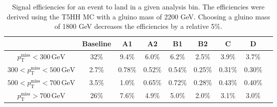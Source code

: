 \begin{table}[hbp!]
\centering
\caption{
Signal efficiencies for an event to land in a given analysis bin.
The efficiencies were derived using the T5HH MC with a gluino mass of 2200 GeV.
Choosing a gluino mass of 1800 GeV decreases the efficiencies by a relative 5\%.
}
\begin{tabular}{c | c c c c c c c c}
\hline
\hline
                                                            & Baseline & A1     & A2      & B1      & B2      & C       & D\\
\hline
$p_{\mathrm{T}}^{\mathrm{miss}}< 300\,\mathrm{GeV}$        & 32\%    & 9.4\%   & 6.0\%   & 6.2\%   & 2.5\%   & 3.9\%   & 3.7\% \\
$300 < p_{\mathrm{T}}^{\mathrm{miss}} < 500\,\mathrm{GeV}$  & 2.7\%   & 0.78\%  & 0.52\%  & 0.54\%  & 0.25\%  & 0.31\%  & 0.30\% \\
$500 < p_{\mathrm{T}}^{\mathrm{miss}} < 700\,\mathrm{GeV}$  & 3.5\%   & 1.0\%   & 0.65\%  & 0.72\%  & 0.28\%  & 0.43\%  & 0.40\% \\
$p_{\mathrm{T}}^{\mathrm{miss}} > 700\,\mathrm{GeV}$        & 26\%    & 7.6\%   & 4.9\%   & 5.0\%   & 2.0\%   & 3.1\%   & 3.0\% \\
\hline
\hline
\end{tabular}
\label{tab:sigeff}
\end{table}
